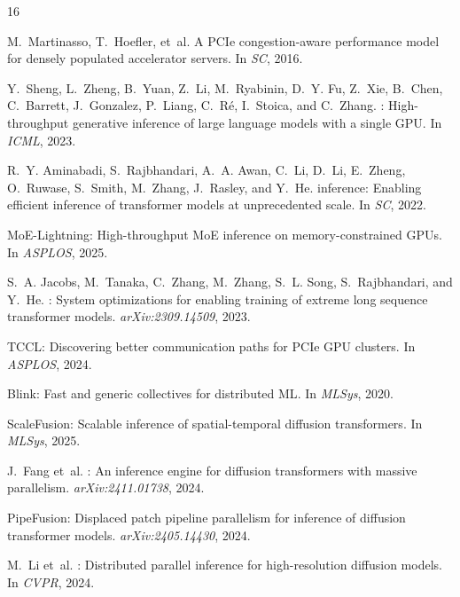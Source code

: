 \documentclass{article}
\begin{document}
\begin{thebibliography}{16}

M.~Martinasso, T.~Hoefler, et~al.
\newblock A {PCIe} congestion-aware performance model for densely populated accelerator servers.
\newblock In \emph{SC}, 2016.

Y.~Sheng, L.~Zheng, B.~Yuan, Z.~Li, M.~Ryabinin, D.~Y. Fu, Z.~Xie, B.~Chen, C.~Barrett, J.~Gonzalez, P.~Liang, C.~R\'{e}, I.~Stoica, and C.~Zhang.
: High-throughput generative inference of large language models with a single {GPU}.
\newblock In \emph{ICML}, 2023.

R.~Y. Aminabadi, S.~Rajbhandari, A.~A. Awan, C.~Li, D.~Li, E.~Zheng, O.~Ruwase, S.~Smith, M.~Zhang, J.~Rasley, and Y.~He.
 inference: Enabling efficient inference of transformer models at unprecedented scale.
\newblock In \emph{SC}, 2022.

{MoE-Lightning}: High-throughput {MoE} inference on memory-constrained {GPUs}.
\newblock In \emph{ASPLOS}, 2025.

S.~A. Jacobs, M.~Tanaka, C.~Zhang, M.~Zhang, S.~L. Song, S.~Rajbhandari, and Y.~He.
: System optimizations for enabling training of extreme long sequence transformer models.
\newblock \emph{arXiv:2309.14509}, 2023.

{TCCL}: Discovering better communication paths for {PCIe} {GPU} clusters.
\newblock In \emph{ASPLOS}, 2024.

{Blink}: Fast and generic collectives for distributed {ML}.
\newblock In \emph{MLSys}, 2020.

{ScaleFusion}: Scalable inference of spatial-temporal diffusion transformers.
\newblock In \emph{MLSys}, 2025.

J.~Fang et~al.
: An inference engine for diffusion transformers with massive parallelism.
\newblock \emph{arXiv:2411.01738}, 2024.

{PipeFusion}: Displaced patch pipeline parallelism for inference of diffusion transformer models.
\newblock \emph{arXiv:2405.14430}, 2024.

M.~Li et~al.
: Distributed parallel inference for high-resolution diffusion models.
\newblock In \emph{CVPR}, 2024.


\end{thebibliography}
\end{document}
